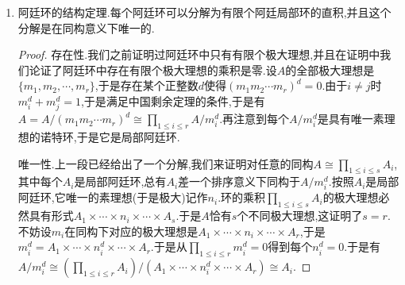 \begin{enumerate}
\begin{proof}
    	充分性,我们先来证明添加一个条件下结论成立,即如果$R$是诺特零维环,并且只有有限个极大理想,那么它是阿廷环.先设全部极大理想为$m_1,m_2,\cdots,m_r$,按照条件它们也就是全部素理想.于是Jacobson根和幂零根相同,记作$I$.按照两个不同的极大理想是互素的,说明$I=\cap m_i=\prod m_i$.诺特性说明每个$m_i$是有限生成的,于是存在一个足够大的正整数$n$使得$I^n=0$.现在构造如下子模链,模仿必要性中的证明,得到相邻两个子模的商是$R$上有限长度模,这得到$R$作为自身模是阿廷的.
    	$$0=I^n\subset\cdots Im_1\subseteq I=m_1m_2\cdots m_r\subset\cdots\subseteq m_1m_2\subseteq m_1\subseteq R$$
    	
    	于是完整的证明充分性需要说明诺特零维环只有有限个素理想.这只要注意到诺特环上极小素理想只有有限个,而零维意味着每个素理想都是极大理想也都是极小素理想.
    \end{proof}
    \item 阿廷环的结构定理.每个阿廷环可以分解为有限个阿廷局部环的直积,并且这个分解是在同构意义下唯一的.
    \begin{proof}
    	
    	存在性.我们之前证明过阿廷环中只有有限个极大理想,并且在证明中我们论证了阿廷环中存在有限个极大理想的乘积是零.设$A$的全部极大理想是$\{m_1,m_2,\cdots,m_r\}$,于是存在某个正整数$d$使得$(m_1m_2\cdots m_r)^d=0$.由于$i\not=j$时$m_i^d+m_j^d=1$,于是满足中国剩余定理的条件,于是有$A=A/(m_1m_2\cdots m_r)^d\cong\prod_{1\le i\le r}A/m_i^d$.再注意到每个$A/m_i^d$是具有唯一素理想的诺特环,于是它是局部阿廷环.
    	
    	唯一性.上一段已经给出了一个分解,我们来证明对任意的同构$A\cong\prod_{1\le i\le s}A_i$,其中每个$A_i$是局部阿廷环,总有$A_i$差一个排序意义下同构于$A/m_i^d$.按照$A_i$是局部阿廷环,它唯一的素理想(于是极大)记作$n_i$.环的乘积$\prod_{1\le i\le s}A_i$的极大理想必然具有形式$A_1\times\cdots\times n_i\times\cdots\times A_s$.于是$A$恰有$s$个不同极大理想,这证明了$s=r$.不妨设$m_i$在同构下对应的极大理想是$A_1\times\cdots\times n_i\times\cdots\times A_r$,于是$m_i^d=A_1\times\cdots\times n_i^d\times\cdots\times A_r$.于是从$\prod_{1\le i\le r}m_i^d=0$得到每个$n_i^d=0$.于是有$A/m_i^d\cong(\prod_{1\le i\le r}A_i)/(A_1\times\cdots\times n_i^d\times\cdots\times A_r)\cong A_i$.
    \end{proof}
\end{enumerate}


